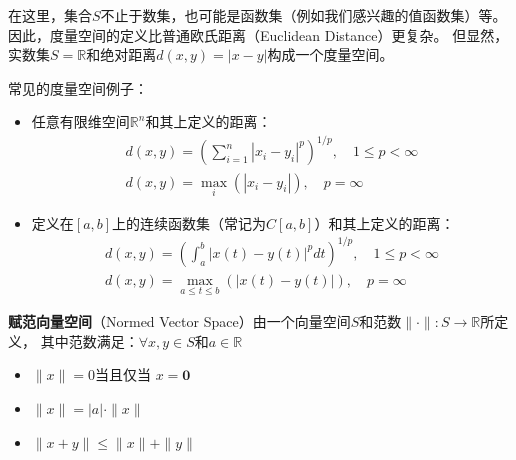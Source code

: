 在这里，集合$S$不止于数集，也可能是函数集（例如我们感兴趣的值函数集）等。
因此，度量空间的定义比普通欧氏距离（Euclidean Distance）更复杂。
但显然，实数集$S = \mathbb{R}$和绝对距离$d\left(x,y\right)=\left|x-y\right|$构成一个度量空间。
\begin{example}
    常见的度量空间例子：
    \begin{itemize}
        \item 任意有限维空间$\mathbb{R}^n$和其上定义的距离：
            \begin{gather*}
                d\left(x,y\right) = \left(\sum_{i=1}^{n} \left|x_i-y_i\right|^p\right)^{1/p},\quad 1 \leq p < \infty \\
                d\left(x,y\right) = \max _i \left(\left|x_i-y_i\right|\right), \quad p=\infty
            \end{gather*}

        \item 定义在$\left[a,b\right]$上的连续函数集（常记为$C\left[a,b\right]$）和其上定义的距离：     
            \begin{gather*}
                d\left(x,y\right)=\left(\int_{a}^{b} \left|x\left(t\right)-y\left(t\right)\right|^{p}dt\right)^{1/p}, 
                    \quad 1 \leq p < \infty \\
                d\left(x,y\right) = \max_{a\leq t \leq b} \left(\left|x\left(t\right)-y\left(t\right)\right|\right), 
                    \quad p = \infty
            \end{gather*}
    \end{itemize}
\end{example}

\begin{definition}
    \textbf{赋范向量空间}（Normed Vector Space）由一个向量空间$S$和范数$\| \cdot \|: S \rightarrow \mathbb{R}$所定义，
    其中范数满足：$\forall x,y \in S$和$a \in \mathbb{R}$
    \begin{itemize}
        \item \( \|x\| = 0 \)当且仅当 \(x=\mathbf{0}\)
        \item $\|x\|=|a|\cdot \|x\|$
        \item $\|x+y\| \leq \|x\|+\|y\|$
    \end{itemize}
\end{definition}

